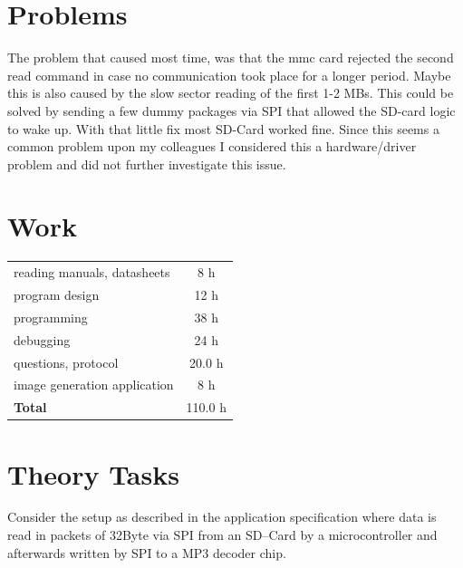 \documentclass[12pt,a4paper,titlepage,oneside]{article}
\begin{document}
\section{Problems}

The problem that caused most time, was that the mmc card rejected the second read command in case no communication took place for a longer period. Maybe this is also caused by the slow sector reading of the first 1-2 MBs. This could be solved by sending a few dummy packages via SPI that allowed the SD-card logic to wake up. With that little fix most SD-Card worked fine. Since this seems a common problem upon my colleagues I considered this a hardware/driver problem and did not further investigate this issue. 

\section{Work}

\begin{tabular}{|l|c|}
\hline
reading manuals, datasheets	& 8 h	\\
program design			& 12 h\\
programming				& 38 h\\
debugging				& 24 h\\
questions, protocol			& 20.0 h\\
image generation application   & 8 h \\
\hline
{\bf Total}					& 110.0 h \\
\hline
\end{tabular}



\section{Theory Tasks}

 Consider the setup as
     described in the application specification where data is read in
     packets of 32Byte via SPI from an SD--Card by a microcontroller
     and afterwards written by SPI to a MP3 decoder chip.
\end{document}
